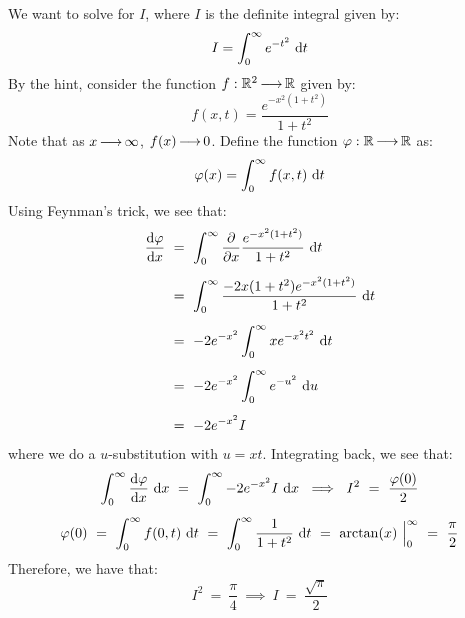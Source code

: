 \begin{soln}
    We want to solve for $ I $, where $ I $ is the definite integral given by:
    \begin{equation*}
        I = \int_{0}^{\infty}e^{-t^{2}}\textrm{ d} t
    \end{equation*}
    By the hint, consider the function $ f:\mathbb{R}^{2}\operatorname{\longrightarrow}\mathbb{R} $ given by:
    \begin{equation*}
        f(x,t) = \frac{e^{-x^{2}(1+t^{2})}}{1+t^{2}}
    \end{equation*}
    Note that as $ x \operatorname{\longrightarrow} \infty $, $ f(x) \operatorname{\longrightarrow} 0 $.
    Define the function $ \operatorname{\varphi}:\mathbb{R}\operatorname{\longrightarrow}\mathbb{R} $ as:
    \begin{equation*}
        \operatorname{\varphi}(x) = \int_{0}^{\infty}f(x,t)\textrm{ d} t
    \end{equation*}
    Using Feynman's trick, we see that:
    \begin{align*}
        \frac{\d\!\vphi}{\d x} \ & = \ \int_{0}^{\infty} \frac{\p}{\p x}
        \frac{e^{-x^{2}(1+t^{2})}} {1+t^{2}} \di t \vsp
        & = \ \int_{0}^{\infty}\frac{-2x(1+t^{2})e^{-x^{2}(1+t^{2})}}{1+t^{2}}
        \di t \vsp
        & = \ -2e^{-x^{2}}\int_{0}^{\infty} xe^{-x^{2}t^{2}} \di t \vsp
        & = \ -2e^{-x^{2}}\int_{0}^{\infty}e^{-u^{2}}\di u \vsp
        & = \ -2e^{-x^{2}}I
    \end{align*}
    where we do a $ u $-substitution with $ u = xt $.
    Integrating back, we see that:
    \begin{gather*}
        \int_{0}^{\infty} \frac{\d\!\vphi}{\d x}\di x \ = \ \int_{0}^{\infty}
        -2e^{-x^{2}}I\di x \ \implies \ I^{2} \ = \ \frac{\vphi(0)}{2} \vsp
        \vphi(0) \ = \ \int_{0}^{\infty}f(0,t)\di t \ = \ \int_{0}^{\infty}
        \frac{1}{1+t^{2}} \di t \ = \ \arctan(x) \ \Big|_{0}^{\infty} \ = \
        \frac{\pi}{2}
    \end{gather*}
    Therefore, we have that:
    \begin{equation*}
        I^{2} \ = \ \frac{\pi}{4} \ \implies \ I \ = \ \frac{\sqrt{\pi}}{2}
    \end{equation*}
\end{soln}


